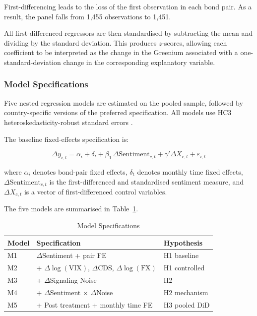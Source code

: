 \documentclass[12pt,a4paper]{article}
\begin{document}
First-differencing leads to the loss of the first observation in each bond pair. As a result, the panel falls from 1,455 observations to 1,451.

All first-differenced regressors are then standardised by subtracting the mean and dividing by the standard deviation. This produces $z$-scores, allowing each coefficient to be interpreted as the change in the Greenium associated with a one-standard-deviation change in the corresponding explanatory variable.

\subsubsection{Model Specifications}

Five nested regression models are estimated on the pooled sample, followed by country-specific versions of the preferred specification. All models use HC3 heteroskedasticity-robust standard errors \citep{MacKinnon1985}.

The baseline fixed-effects specification is:

\begin{equation}
\Delta y_{i,t} = \alpha_i + \delta_t + \beta_1 \, \Delta\text{Sentiment}_{c,t} + \gamma' \Delta X_{c,t} + \varepsilon_{i,t}
\label{eq:baseline}
\end{equation}

\noindent where $\alpha_i$ denotes bond-pair fixed effects, $\delta_t$ denotes monthly time fixed effects, $\Delta\text{Sentiment}_{c,t}$ is the first-differenced and standardised sentiment measure, and $\Delta X_{c,t}$ is a vector of first-differenced control variables.

The five models are summarised in Table~\ref{tab:models}.

\begin{table}[H]
\centering
\caption{Model Specifications}
\label{tab:models}
\small
\begin{tabular}{lll}
\toprule
\textbf{Model} & \textbf{Specification} & \textbf{Hypothesis} \\
\midrule
M1 & $\Delta$Sentiment + pair FE & H1 baseline \\
M2 & + $\Delta\log(\text{VIX})$, $\Delta$CDS, $\Delta\log(\text{FX})$ & H1 controlled \\
M3 & + $\Delta$Signaling Noise & H2 \\
M4 & + $\Delta$Sentiment $\times$ $\Delta$Noise & H2 mechanism \\
M5 & + Post treatment + monthly time FE & H3 pooled DiD \\
\bottomrule
\end{tabular}
\end{table}
\end{document}
